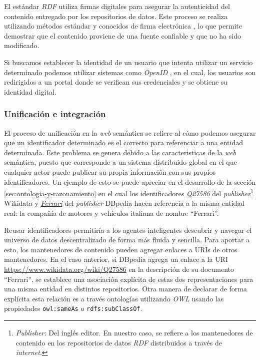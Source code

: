 El estándar \textit{RDF} utiliza firmas digitales para asegurar la autenticidad del contenido entregado por los repositorios de datos. Este proceso se realiza utilizando métodos estándar y conocidos de firma electrónica \cite{carroll2003signing}, lo que permite demostrar que el contenido proviene de una fuente confiable y que no ha sido modificado.

Si buscamos establecer la identidad de un usuario que intenta utilizar un servicio determinado podemos utilizar sistemas como \textit{OpenID} \cite{recordon2006openid}, en el cual, los usuarios son redirigidos a un portal donde se verifican sus credenciales y se obtiene su identidad digital.

\subsubsection{Unificación e integración}

El proceso de unificación en la \textit{web} semántica se refiere al cómo podemos asegurar que un identificador determinado es el correcto para referenciar a una entidad determinada. Este problema se genera debido a las caracteristicas de la \textit{web} semántica, puesto que corresponde a un sistema distribuido global en el que cualquier actor puede publicar su propia información con sus propios identificadores. Un ejemplo de esto se puede apreciar en el desarrollo de la sección \ref{sec:ontologia-y-razonamiento} en el cual los identificadores \href{https://www.wikidata.org/wiki/Q27586}{\textit{Q27586}} del \textit{publisher}\footnote{\textit{Publisher:} Del inglés editor. En nuestro caso, se refiere a los mantenedores de contenido en los repositorios de datos \textit{RDF} distribuidos a través de \textit{internet}.} Wikidata y \href{http://dbpedia.org/page/Ferrari}{\textit{Ferrari}} del \textit{publisher} DBpedia hacen referencia a la misma entidad real: la compañía de motores y vehículos italiana de nombre ``Ferrari''.

Reusar identificadores permitiría a los agentes inteligentes descubrir y navegar el universo de datos descentralizado de forma más fluida y sencilla. Para aportar a esto, los mantenedores de contenido pueden agregar enlaces a URIs de otros mantenedores. En el caso anterior, si DBpedia agrega un enlace a la URI \url{https://www.wikidata.org/wiki/Q27586} en la descripción de su documento ``Ferrari'', se establece una asociación explícita de estas dos representaciones para una misma entidad en distintos repositorios. Otra manera de declarar de forma explícita esta relación es a través ontologías utilizando \textit{OWL} usando las propiedades \texttt{owl:sameAs} o \texttt{rdfs:subClassOf}.

